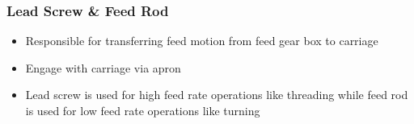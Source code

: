 \documentclass{article}
\begin{document}
\subsubsection*{Lead Screw \& Feed Rod}
\begin{itemize}
  \item  Responsible for transferring feed motion from feed gear box to carriage
  \item Engage with carriage via apron 
  \item Lead screw is used for high feed rate operations like threading while feed rod is used for low feed rate operations like turning
\end{itemize}

\begin{figure}
  \centering

  \hfill
  \hfill

  \vspace{0.2cm}


\end{figure}
\end{document}
